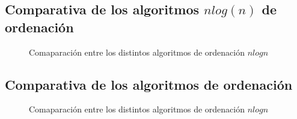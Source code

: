 \documentclass{article}
\begin{document}
\subsection{Comparativa de los algoritmos $nlog(n)$ de ordenación}

\begin{figure}[H]
  \centering   
      \subfloat {%

        
        
      }
      
      \caption{Comaparación entre los distintos algoritmos de ordenación $nlogn$}
\end{figure}

\subsection{Comparativa de los algoritmos de ordenación}

\begin{figure}[H]
  \centering   
      \subfloat {%
        
      }
      
      \caption{Comaparación entre los distintos algoritmos de ordenación $nlogn$}
\end{figure}
\end{document}
